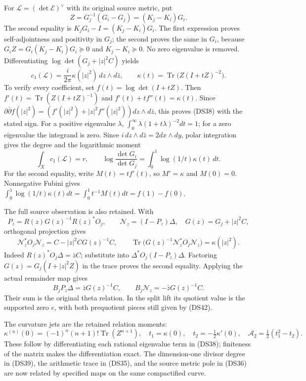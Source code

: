 For $\mathscr L=(\det\mathscr E)^\vee$ with its original source metric,
put
\[
 Z=G_j^{-1}(G_i-G_j)=(K_j-K_i)G_i.
 \tag{DS37}
\]
The second equality is $K_jG_i-I=(K_j-K_i)G_i$.
The first expression proves self-adjointness and positivity in $G_j$;
the second proves the same in $G_i$, because
$G_iZ=G_i(K_j-K_i)G_i\succeq0$ and $K_j-K_i\succeq0$.
No zero eigenvalue is removed.  Differentiating
$\log\det(G_j+|z|^2C)$ yields
\[
 c_1(\mathscr L)=\frac{i}{2\pi}\kappa(|z|^2)\,dz\wedge d\bar z,
 \qquad \kappa(t)=\operatorname{Tr}\bigl(Z(I+tZ)^{-2}\bigr).
 \tag{DS38}
\]
To verify every coefficient, set $f(t)=\log\det(I+tZ)$.
Then $f'(t)=\operatorname{Tr}(Z(I+tZ)^{-1})$ and
$f'(t)+tf''(t)=\kappa(t)$.  Since
$\partial\bar\partial f(|z|^2)=(f'(|z|^2)+|z|^2f''(|z|^2))
dz\wedge d\bar z$, this proves (DS38) with the stated sign.
For a positive eigenvalue $\lambda$,
$\int_0^\infty\lambda(1+t\lambda)^{-2}dt=1$; for a zero eigenvalue
the integrand is zero.  Since $i\,dz\wedge d\bar z=2dx\wedge dy$,
polar integration gives the degree and the logarithmic moment
\[
 \int_X c_1(\mathscr L)=r,\qquad
 \log\frac{\det G_i}{\det G_j}
 =\int_0^1\log(1/t)\kappa(t)\,dt.
 \tag{DS39}
\]
For the second equality, write $M(t)=tf'(t)$, so $M'=\kappa$ and
$M(0)=0$.  Nonnegative Fubini gives
$\int_0^1\log(1/t)\kappa(t)dt
=\int_0^1t^{-1}M(t)dt=f(1)-f(0)$.

The full source observation is also retained.  With
\[
 P_z=R(z)G(z)^{-1}R(z)^*O_j,
 \qquad\mathcal N_z=(I-P_z)\Delta,
 \quad G(z)=G_j+|z|^2C,
 \tag{DS40}
\]
orthogonal projection gives
\[
 \mathcal N_z^*O_j\mathcal N_z=C-|z|^2CG(z)^{-1}C,
 \qquad\operatorname{Tr}\bigl(G(z)^{-1}\mathcal N_z^*O_j\mathcal N_z\bigr)
 =\kappa(|z|^2).
 \tag{DS41}
\]
Indeed $R(z)^*O_j\Delta=\bar zC$; substitute into
$\Delta^*O_j(I-P_z)\Delta$.  Factoring
$G(z)=G_j(I+|z|^2Z)$ in the trace proves the second equality.
Applying the actual remainder map gives
\[
 B_jP_z\Delta=\bar zG(z)^{-1}C,
 \qquad B_j\mathcal N_z=-\bar zG(z)^{-1}C.
 \tag{DS42}
\]
Their sum is the original theta relation.  In the split lift its
quotient value is the supported zero $e$, with both prequotient
pieces still given by (DS42).

The curvature jets are the retained relation moments:
\[
 \kappa^{(n)}(0)=(-1)^n(n+1)!\operatorname{Tr}(Z^{n+1}),
 \quad t_1=\kappa(0),\quad t_2=-\tfrac12\kappa'(0),
 \quad\mathcal A_2=\tfrac12(t_1^2-t_2).
 \tag{DS43}
\]
These follow by differentiating each rational eigenvalue term in
(DS38); finiteness of the matrix makes the differentiation exact.
The dimension-one divisor degree in (DS39), the arithmetic trace in
(DS35), and the source metric pole in (DS36) are now related by
specified maps on the same compactified curve.

